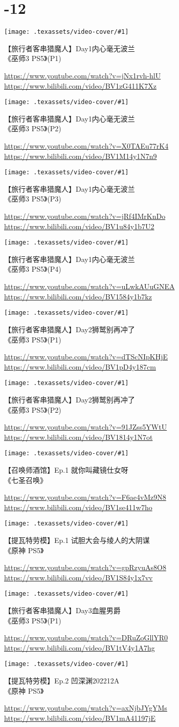 


\newcommand{\videoitem}[4]{
    \parbox[b][29mm][b]{\linewidth}{%
        \texttt{[image: .texassets/video-cover/\#1]}%
        \hfill%
        \parbox[b][29mm][b]{27em}{
            \raggedright
            \large#2\par\vfill
            \footnotesize\ttfamily
            \textcolor{gray}{%
                \href{https://www.youtube.com/watch?v=#3}{https://www.youtube.com/watch?v=#3}\linebreak%
                \href{https://www.bilibili.com/video/#4}{https://www.bilibili.com/video/#4}%
            }\par\vskip 2pt%
        }%
    }%
    \par
    \vskip 11pt
}




\section*{-12}

\videoitem{wit3ps5/wit3ps5-day001-1}{【旅行者客串猎魔人】Day1内心毫无波兰\\《巫师3 PS5》(P1)}{jNx1rvh-hlU}{BV1zG411K7Xz}
\videoitem{wit3ps5/wit3ps5-day001-2}{【旅行者客串猎魔人】Day1内心毫无波兰\\《巫师3 PS5》(P2)}{X0TAEu77rK4}{BV1M14y1N7n9}
\videoitem{wit3ps5/wit3ps5-day001-3}{【旅行者客串猎魔人】Day1内心毫无波兰\\《巫师3 PS5》(P3)}{jRf4IMrKnDo}{BV1u84y1b7U2}
\videoitem{wit3ps5/wit3ps5-day001-4}{【旅行者客串猎魔人】Day1内心毫无波兰\\《巫师3 PS5》(P4)}{uLwkAUuGNEA}{BV1584y1b7kz}
\videoitem{wit3ps5/wit3ps5-day002-1}{【旅行者客串猎魔人】Day2狮鹫别再冲了\\《巫师3 PS5》(P1)}{dTScNIpKHjE}{BV1pD4y187cm}
\videoitem{wit3ps5/wit3ps5-day002-2}{【旅行者客串猎魔人】Day2狮鹫别再冲了\\《巫师3 PS5》(P2)}{91JZss5YWtU}{BV1814y1N7ot}
\videoitem{ys-geninv/ysgi-0001}{【召唤师酒馆】Ep.1 就你叫藏镜仕女呀\\《七圣召唤》}{F6ae4vMz9N8}{BV1se411w7ho}
\videoitem{ys-std/ys-0001}{【提瓦特劳模】Ep.1 试胆大会与绫人的大阴谋\\《原神 PS5》}{gpRzyuAs8O8}{BV1S84y1x7vv}
\videoitem{wit3ps5/wit3ps5-day003-1}{【旅行者客串猎魔人】Day3血腥男爵\\《巫师3 PS5》(P1)}{DRuZoGllYR0}{BV1tV4y1A7hg}
\videoitem{ys-std/ys-0002}{【提瓦特劳模】Ep.2 凹深渊202212A\\《原神 PS5》}{axNjbJYgYMs }{BV1mA41197jE}

